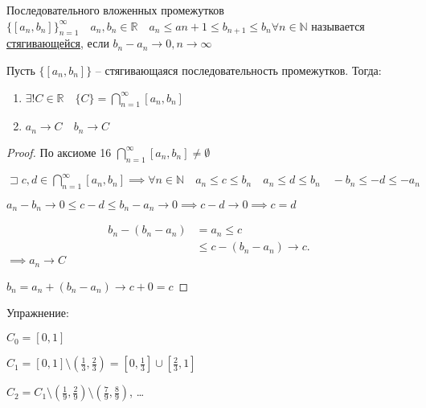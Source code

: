 \documentclass{book}
\newcommand\N{\ensuremath{\mathbb{N}}}
\newcommand\R{\ensuremath{\mathbb{R}}}
\renewcommand\O{\ensuremath{\emptyset}}
\theoremstyle{definition}
\begin{document}
\begin{definition}
    Последовательного вложенных промежутков $\{[a_n, b_n]\}_{n=1}^{\infty }\quad a_n, b_n\in \R\quad a_n\leqslant a{n+1}\leqslant b_{n+1}\leqslant b_n \forall n\in \N $ называется \underline{стягивающейся}, если $b_n-a_n\to 0, n\to \infty $ 
\end{definition}
\begin{theorem}
    Пусть $\{[a_n, b_n]\}$ -- стягивающаяся последовательность промежутков. Тогда:
    \begin{enumerate}
        \item $\exists ! C\in \R\quad \{C\} = \bigcap\limits_{n=1}^{\infty }[a_n, b_n] $ 
        \item $a_n\to C\quad b_n\to C$
    \end{enumerate}
\end{theorem}
\begin{proof}
    По аксиоме 16 $\bigcap\limits_{n=1}^{\infty }[a_n, b_n]\neq \O  $ 

    $\sqsupset c, d\in \bigcap\limits_{n=1}^{\infty }[a_n, b_n] \implies  \forall n\in \N \quad a_n\leqslant c\leqslant b_n\quad a_n\leqslant d\leqslant b_n \quad -b_n\leqslant -d\leqslant -a_n$ 

    $a_n-b_n \to 0\leqslant c-d\leqslant b_n-a_n\to 0 \implies c-d\to 0\implies c=d$

    \begin{align*}
        b_n-(b_n-a_n) &= a_n\leqslant c\\
                      &\leqslant c-(b_n-a_n)\to c
    .\end{align*}
    $\implies a_n\to C$

    $b_n = a_n+(b_n-a_n)\to c+0=c$
\end{proof}
Упражнение:

$C_0 = [0,1]$

$C_1 = [0,1] \setminus (\frac{1}{3}, \frac{2}{3}) = [0,\frac{1}{3}] \cup  [\frac{2}{3}, 1]$ 

$C_2 = C_1 \setminus (\frac{1}{9}, \frac{2}{9}) \setminus (\frac{7}{9}, \frac{8}{9})$, \ldots

\end{document}

